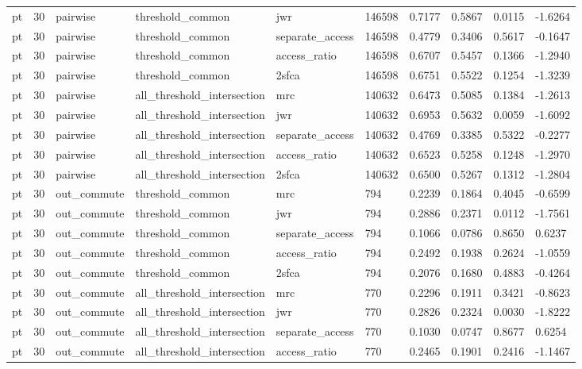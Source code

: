 \begin{table}[htbp]
\begin{tabular}{llllllllll}
pt & 30 & pairwise & threshold\_common & jwr & 146598 & 0.7177 & 0.5867 & 0.0115 & -1.6264 \\
pt & 30 & pairwise & threshold\_common & separate\_access & 146598 & 0.4779 & 0.3406 & 0.5617 & -0.1647 \\
pt & 30 & pairwise & threshold\_common & access\_ratio & 146598 & 0.6707 & 0.5457 & 0.1366 & -1.2940 \\
pt & 30 & pairwise & threshold\_common & 2sfca & 146598 & 0.6751 & 0.5522 & 0.1254 & -1.3239 \\
pt & 30 & pairwise & all\_threshold\_intersection & mrc & 140632 & 0.6473 & 0.5085 & 0.1384 & -1.2613 \\
pt & 30 & pairwise & all\_threshold\_intersection & jwr & 140632 & 0.6953 & 0.5632 & 0.0059 & -1.6092 \\
pt & 30 & pairwise & all\_threshold\_intersection & separate\_access & 140632 & 0.4769 & 0.3385 & 0.5322 & -0.2277 \\
pt & 30 & pairwise & all\_threshold\_intersection & access\_ratio & 140632 & 0.6523 & 0.5258 & 0.1248 & -1.2970 \\
pt & 30 & pairwise & all\_threshold\_intersection & 2sfca & 140632 & 0.6500 & 0.5267 & 0.1312 & -1.2804 \\
pt & 30 & out\_commute & threshold\_common & mrc & 794 & 0.2239 & 0.1864 & 0.4045 & -0.6599 \\
pt & 30 & out\_commute & threshold\_common & jwr & 794 & 0.2886 & 0.2371 & 0.0112 & -1.7561 \\
pt & 30 & out\_commute & threshold\_common & separate\_access & 794 & 0.1066 & 0.0786 & 0.8650 & 0.6237 \\
pt & 30 & out\_commute & threshold\_common & access\_ratio & 794 & 0.2492 & 0.1938 & 0.2624 & -1.0559 \\
pt & 30 & out\_commute & threshold\_common & 2sfca & 794 & 0.2076 & 0.1680 & 0.4883 & -0.4264 \\
pt & 30 & out\_commute & all\_threshold\_intersection & mrc & 770 & 0.2296 & 0.1911 & 0.3421 & -0.8623 \\
pt & 30 & out\_commute & all\_threshold\_intersection & jwr & 770 & 0.2826 & 0.2324 & 0.0030 & -1.8222 \\
pt & 30 & out\_commute & all\_threshold\_intersection & separate\_access & 770 & 0.1030 & 0.0747 & 0.8677 & 0.6254 \\
pt & 30 & out\_commute & all\_threshold\_intersection & access\_ratio & 770 & 0.2465 & 0.1901 & 0.2416 & -1.1467 \\

\end{tabular}
\end{table}
